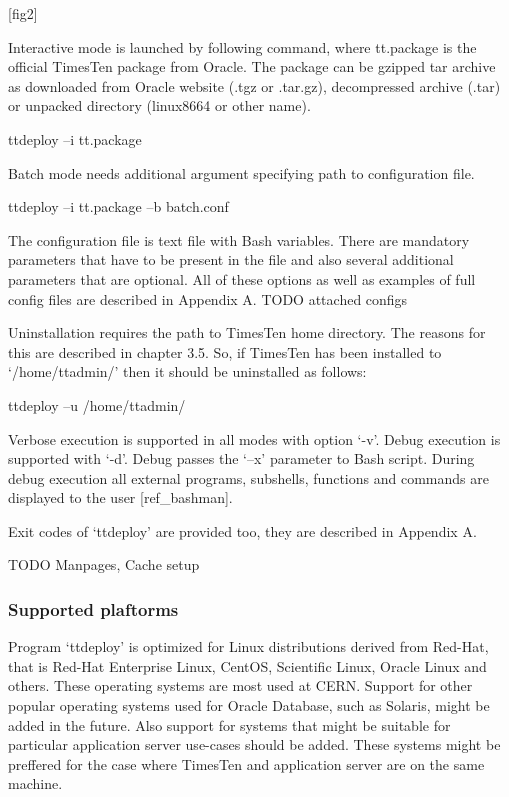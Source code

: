 \documentclass[11pt, letterpaper]{article}            %
\begin{document}
[fig2]

Interactive mode is launched by following command, where tt.package is the official TimesTen package from Oracle. The package can be gzipped tar archive as downloaded from Oracle website (.tgz or .tar.gz), decompressed archive (.tar) or unpacked directory (linux8664 or  other name).

                ttdeploy –i tt.package

Batch mode needs additional argument specifying path to configuration file.

                ttdeploy –i tt.package –b batch.conf

The configuration file is text file with Bash variables. There are mandatory parameters that have to be present in the file and also several additional parameters that are optional. All of these options as well as examples of full config files are described in Appendix A. TODO attached configs

Uninstallation requires the path to TimesTen home directory. The reasons for this are described in chapter 3.5. So, if TimesTen has been installed to ‘/home/ttadmin/’ then it should be uninstalled as follows:

                ttdeploy –u /home/ttadmin/

Verbose execution is supported in all modes with option ‘-v’. Debug execution is supported with ‘-d’. Debug passes the ‘–x’ parameter to Bash script. During debug execution all external programs, subshells, functions and commands are displayed to the user [ref_bashman].

Exit codes of ‘ttdeploy’ are provided too, they are described in Appendix A.

TODO Manpages, Cache setup

\subsubsection{Supported plaftorms}

Program ‘ttdeploy’ is optimized for Linux distributions derived from Red-Hat, that is Red-Hat Enterprise Linux, CentOS, Scientific Linux, Oracle Linux and others. These operating systems are most used at CERN. Support for other popular operating systems used for Oracle Database, such as Solaris, might be added in the future. Also support for systems that might be suitable for particular application server use-cases should be added. These systems might be preffered for the case where TimesTen and application server are on the same machine.
\end{document}
